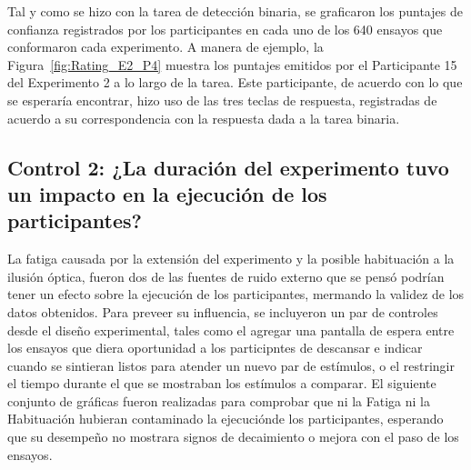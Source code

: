 \begin{itemize}
Tal y como se hizo con la tarea de detección binaria, se graficaron los puntajes de confianza registrados por los participantes en cada uno de los 640 ensayos que conformaron cada experimento. A manera de ejemplo, la Figura~\ref{fig:Rating_E2_P4} muestra los puntajes emitidos por el Participante 15 del Experimento 2 a lo largo de la tarea. Este participante, de acuerdo con lo que se esperaría encontrar, hizo uso de las tres teclas de respuesta, registradas de acuerdo a su correspondencia con la respuesta dada a la tarea binaria.\\ 
 

\end{itemize}










\subsection{Control 2: ¿La duración del experimento tuvo un impacto en la ejecución de los participantes?}

La fatiga causada por la extensión del experimento y la posible habituación a la ilusión óptica, fueron dos de las fuentes de ruido externo que se pensó podrían tener un efecto sobre la ejecución de los participantes, mermando la validez de los datos obtenidos. Para preveer su influencia, se incluyeron un par de controles desde el diseño experimental, tales como el agregar una pantalla de espera entre los ensayos que diera oportunidad a los participntes de descansar e indicar cuando se sintieran listos para atender un nuevo par de estímulos, o el restringir el tiempo durante el que se mostraban los estímulos a comparar. El siguiente conjunto de gráficas fueron realizadas para comprobar que ni la Fatiga ni la Habituación hubieran contaminado la ejecuciónde los participantes, esperando que su desempeño no mostrara signos de decaimiento o mejora con el paso de los ensayos.\\ 

